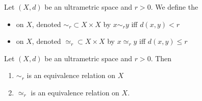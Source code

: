 \documentclass{book}
\begin{document}
\begin{defn}
	Let $(X,d)$ be an ultrametric space and $r > 0$. We define the 
	\begin{itemize}
		\item {} on $X$, denoted $\sim_r \subset X \times X$ by $x \sim_r y$ iff $d(x,y) < r$
		\item {} on $X$, denoted $\simeq_r \subset X \times X$ by $x \simeq_r y$ iff $d(x,y) \leq r$
	\end{itemize}
\end{defn}

\begin{ex}
	Let $(X,d)$ be an ultrametric space and $r > 0$. Then
	\begin{enumerate}
		\item $\sim_r$ is an equivalence relation on $X$
		\item $\simeq_r$ is an equivalence relation on $X$. 
	\end{enumerate}
\end{ex}
\end{document}
